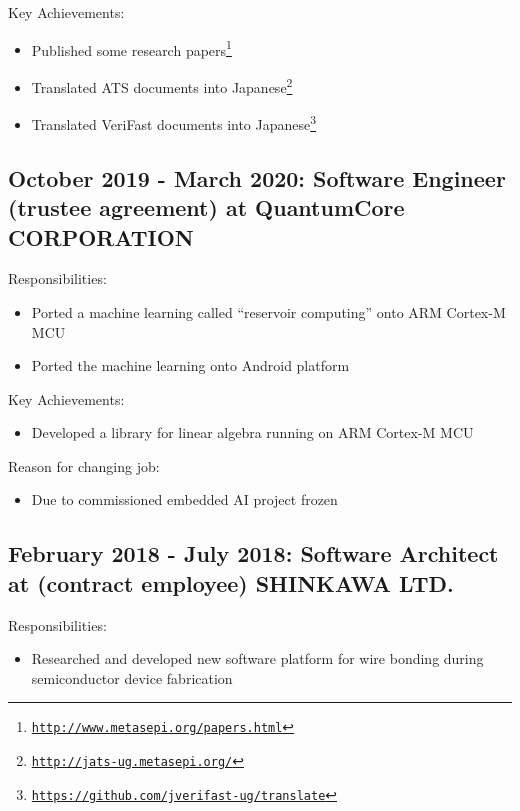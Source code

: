 \documentclass[letterpaper]{article}
\begin{document}
\noindent Key Achievements:

\begin{itemize}
  \item Published some research papers\footnote{\href{http://www.metasepi.org/papers.html}{\tt http://www.metasepi.org/papers.html}}
  \item Translated ATS documents into Japanese\footnote{\href{http://jats-ug.metasepi.org/}{\tt http://jats-ug.metasepi.org/}}
  \item Translated VeriFast documents into Japanese\footnote{\href{https://github.com/jverifast-ug/translate}{\tt https://github.com/jverifast-ug/translate}}
\end{itemize}

\subsection*{October 2019 - March 2020: Software Engineer (trustee agreement) at QuantumCore CORPORATION}

\noindent Responsibilities:

\begin{itemize}
  \item Ported a machine learning called ``reservoir computing'' onto ARM Cortex-M MCU
  \item Ported the machine learning onto Android platform
\end{itemize}

\noindent Key Achievements:

\begin{itemize}
  \item Developed a library for linear algebra running on ARM Cortex-M MCU
\end{itemize}

\noindent Reason for changing job:

\begin{itemize}
  \item Due to commissioned embedded AI project frozen
\end{itemize}

\subsection*{February 2018 - July 2018: Software Architect at (contract employee) SHINKAWA LTD.}

\noindent Responsibilities:

\begin{itemize}
  \item Researched and developed new software platform for wire bonding during semiconductor device fabrication
\end{itemize}
\end{document}
